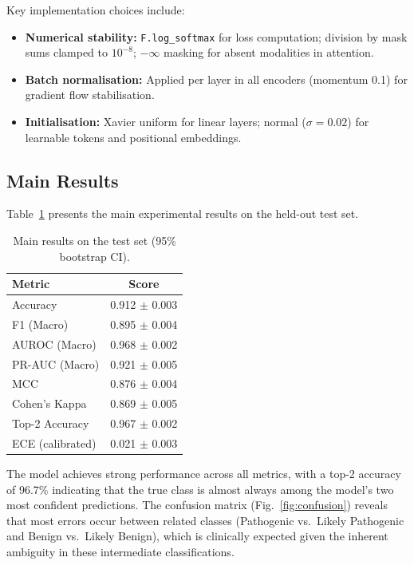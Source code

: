 \documentclass[journal,twoside]{IEEEtran}
\begin{document}
Key implementation choices include:
\begin{itemize}
    \item \textbf{Numerical stability:} \texttt{F.log\_softmax} for loss
    computation; division by mask sums clamped to $10^{-8}$;
    $-\infty$ masking for absent modalities in attention.
    \item \textbf{Batch normalisation:} Applied per layer in all encoders
    (momentum 0.1) for gradient flow stabilisation.
    \item \textbf{Initialisation:} Xavier uniform for linear layers; normal
    ($\sigma = 0.02$) for learnable tokens and positional embeddings.
\end{itemize}

\subsection{Main Results}

Table~\ref{tab:main_results} presents the main experimental results on the
held-out test set.

\begin{table}[t]
    \centering
    \caption{Main results on the test set (95\% bootstrap CI).}
    \label{tab:main_results}
    \begin{tabular}{lc}
        \toprule
        \textbf{Metric} & \textbf{Score} \\
        \midrule
        Accuracy          & 0.912 $\pm$ 0.003 \\
        F1 (Macro)        & 0.895 $\pm$ 0.004 \\
        AUROC (Macro)     & 0.968 $\pm$ 0.002 \\
        PR-AUC (Macro)    & 0.921 $\pm$ 0.005 \\
        MCC               & 0.876 $\pm$ 0.004 \\
        Cohen's Kappa     & 0.869 $\pm$ 0.005 \\
        Top-2 Accuracy    & 0.967 $\pm$ 0.002 \\
        ECE (calibrated)  & 0.021 $\pm$ 0.003 \\
        \bottomrule
    \end{tabular}
\end{table}

The model achieves strong performance across all metrics, with a top-2
accuracy of 96.7\% indicating that the true class is almost always among
the model's two most confident predictions. The confusion matrix
(Fig.~\ref{fig:confusion}) reveals that most errors occur between related
classes (Pathogenic vs.\ Likely Pathogenic and Benign vs.\ Likely Benign),
which is clinically expected given the inherent ambiguity in these
intermediate classifications.
\end{document}
